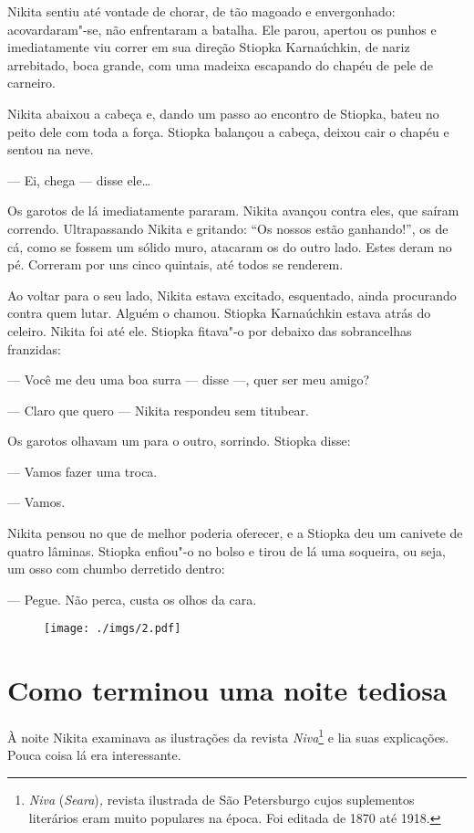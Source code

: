 Nikita sentiu até vontade de chorar, de tão magoado e envergonhado:
acovardaram"-se, não enfrentaram a batalha. Ele parou, apertou os punhos
e imediatamente viu correr em sua direção Stiopka Karnaúchkin, de nariz
arrebitado, boca grande, com uma madeixa escapando do chapéu de pele de
carneiro.

Nikita abaixou a cabeça e, dando um passo ao encontro de Stiopka, bateu
no peito dele com toda a força. Stiopka balançou a cabeça, deixou cair o
chapéu e sentou na neve.

--- Ei, chega --- disse ele\ldots{}

Os garotos de lá imediatamente pararam. Nikita avançou contra
eles, que saíram correndo. Ultrapassando Nikita e gritando: ``Os nossos
estão ganhando!'', os de cá, como se fossem um sólido muro, atacaram os
do outro lado. Estes deram no pé. Correram por uns cinco quintais, até
todos se renderem.

Ao voltar para o seu lado, Nikita estava excitado, esquentado, ainda
procurando contra quem lutar. Alguém o chamou. Stiopka Karnaúchkin
estava atrás do celeiro. Nikita foi até ele. Stiopka fitava"-o por
debaixo das sobrancelhas franzidas:

--- Você me deu uma boa surra --- disse ---, quer ser meu amigo?

--- Claro que quero --- Nikita respondeu sem titubear.

Os garotos olhavam um para o outro, sorrindo. Stiopka disse:

--- Vamos fazer uma troca.

--- Vamos.

Nikita pensou no que de melhor poderia oferecer, e a Stiopka deu um
canivete de quatro lâminas. Stiopka enfiou"-o no bolso e tirou de lá uma
soqueira, ou seja, um osso com chumbo derretido dentro: \enlargethispage{\baselineskip}

--- Pegue. Não perca, custa os olhos da cara.

\begin{figure}
\vspace*{-2.65cm}
\hspace*{-2.85cm}\texttt{[image: ./imgs/2.pdf]}
\end{figure}

\chapter{Como terminou uma noite tediosa}

À noite Nikita examinava as ilustrações da revista \emph{Niva}\footnote{\emph{Niva}
  (\emph{Seara})\emph{,} revista ilustrada de São Petersburgo cujos
  suplementos literários eram muito populares na época. Foi editada de
  1870 até 1918.} e lia suas explicações. Pouca coisa lá era
interessante.

